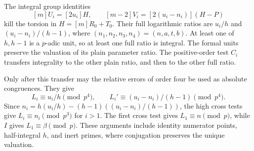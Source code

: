The integral group identities
\[
                  [m]U_i=[2u_i]H,\qquad
                  [m-2]V_i=[2(u_i-n_i)](H-P)
\]
kill the torsion in $H=[m]R_0+T_0$. Their full logarithmic ratios
are $u_i/h$ and $(u_i-n_i)/(h-1)$, where
$(n_1,n_2,n_3,n_4)=(n,a,t,b)$. At least one of $h,h-1$ is a
$p$-adic unit, so at least one full ratio is integral. The formal
units preserve the valuation of its plain parameter ratio.
The positive-order test $C_i$ transfers integrality to the other
plain ratio, and then to the other full ratio.

Only after this transfer may the relative errors of order four
be used as absolute congruences. They give
\[
 L_i\equiv u_i/h\pmod{p^4},\qquad
 L_i'\equiv(u_i-n_i)/(h-1)\pmod{p^4}.
\]
Since $n_i=h(u_i/h)-(h-1)((u_i-n_i)/(h-1))$, the high cross tests
give $L_i\equiv n_i\pmod{p^3}$ for $i>1$. The first cross test
gives $L_1\equiv n\pmod p$, while $I$ gives $L_1\equiv\beta\pmod p$.
These arguments include identity numerator points, half-integral $h$,
and inert primes, where conjugation preserves the unique valuation.

